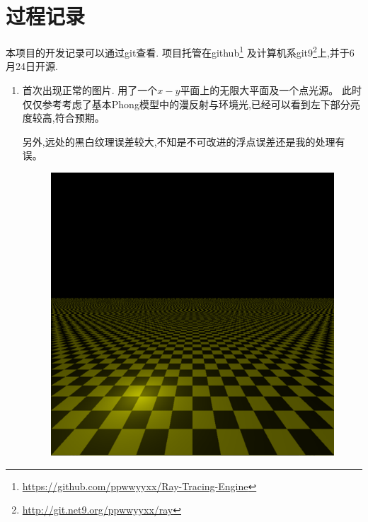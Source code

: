\section{过程记录}
本项目的开发记录可以通过git查看. 项目托管在github\footnote{\url{https://github.com/ppwwyyxx/Ray-Tracing-Engine}}
及计算机系git9\footnote{\url{http://git.net9.org/ppwwyyxx/ray}}上,并于6月24日开源.

\begin{enumerate}
  \item
    首次出现正常的图片. 用了一个$ x-y$平面上的无限大平面及一个点光源。
    此时仅仅参考\cite{phong}考虑了基本Phong模型中的漫反射与环境光,已经可以看到左下部分亮度较高,符合预期。

    另外,远处的黑白纹理误差较大,不知是不可改进的浮点误差还是我的处理有误。
    \begin{figure}[H]
      \centering
      \includegraphics[scale=0.4]{img/first_pic.png}
      \caption{\label{fig:first}}
    \end{figure}


\end{enumerate}
